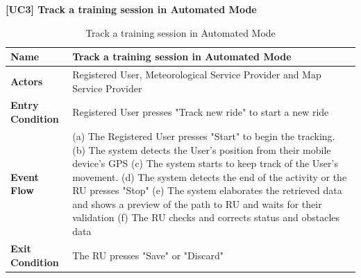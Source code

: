 \documentclass{article}
\begin{document}
\newpage
\textbf{[UC3] Track a training session in Automated Mode}
\begin{table}[H]
    \centering
    \begin{tabularx}{\textwidth}{|l|X|}
        \hline
        \textbf{Name} & \textbf{Track a training session in Automated Mode} \\
        \hline
        \textbf{Actors} & Registered User, Meteorological Service Provider and Map Service Provider\\
        \hline
        \textbf{Entry Condition} & Registered User presses "Track new ride" to start a new ride\\
        \hline
        \textbf{Event Flow} & 
        (a) The Registered User presses "Start" to begin the tracking.
        \vspace{0.2cm}
        \newline
        (b) The system detects the User's position from their mobile device's GPS
        \vspace{0.2cm}
        \newline
        (c)  The system starts to keep track of the User's movement.
        \vspace{0.2cm}
        \newline
        (d) The system detects the end of the activity or the RU presses "Stop"
        \vspace{0.2cm}
        \newline
        (e) The system elaborates the retrieved data and shows a preview of the path to RU and waits for their validation
        \vspace{0.2cm}
        \newline
        (f) The RU checks and corrects status and obstacles data
        \\
        \hline
        \textbf{Exit Condition} & The RU presses "Save" or "Discard" \\
        \hline
    \end{tabularx}
    \caption{Track a training session in Automated Mode}
\end{table}
\end{document}
